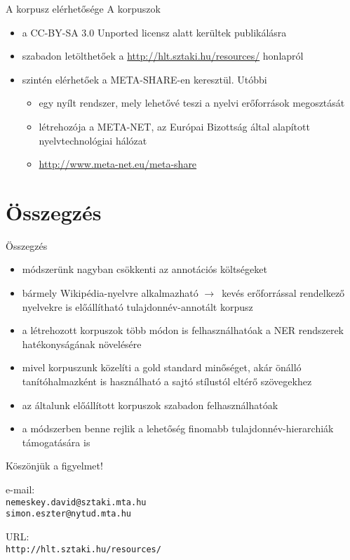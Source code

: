 \documentclass[utf8x,t]{beamer}
\newcommand{\vitem}{\item \vspace{4pt}}
\newcommand{\nyil}{$\rightarrow$\ }
\begin{document}
\begin{frame}{A korpusz elérhetősége}
\bigskip
A korpuszok
\begin{itemize}
\vitem a CC-BY-SA 3.0 Unported licensz alatt kerültek publikálásra
\vitem szabadon letölthetőek a \url{http://hlt.sztaki.hu/resources/} honlapról
\vitem szintén elérhetőek a META-SHARE-en keresztül. Utóbbi
  \begin{itemize}
  \vitem egy nyílt rendszer, mely lehetővé teszi a nyelvi erőforrások megosztását
  \vitem létrehozója a META-NET, az Európai Bizottság által alapított nyelvtechnológiai hálózat
  \vitem \url{http://www.meta-net.eu/meta-share}
  \end{itemize}
\end{itemize}

\end{frame}

\section{Összegzés}
\begin{frame}{Összegzés}
  \begin{itemize}
  \vitem módszerünk nagyban csökkenti az annotációs költségeket 
  \vitem bármely Wikipédia-nyelvre alkalmazható \nyil kevés erőforrással rendelkező nyelvekre is előállítható tulajdonnév-annotált korpusz
  \vitem a létrehozott korpuszok több módon is felhasználhatóak a NER rendszerek hatékonyságának növelésére
  \vitem mivel korpuszunk közelíti a gold standard minőséget, akár önálló tanítóhalmazként is használható a sajtó stílustól eltérő szövegekhez
  \vitem az általunk előállított korpuszok szabadon felhasználhatóak
  \vitem a módszerben benne rejlik a lehetőség finomabb tulajdonnév-hierarchiák támogatására is
  \end{itemize}
  \vfill
\end{frame}

\begin{frame}

\bigskip

\bigskip

{\huge Köszönjük a figyelmet!}

\bigskip
\bigskip
\bigskip

e-mail: \\ {\tt nemeskey.david@sztaki.mta.hu \\ simon.eszter@nytud.mta.hu} \\

\bigskip
\bigskip

URL: \\ {\tt http://hlt.sztaki.hu/resources/}


\end{frame}
\end{document}
